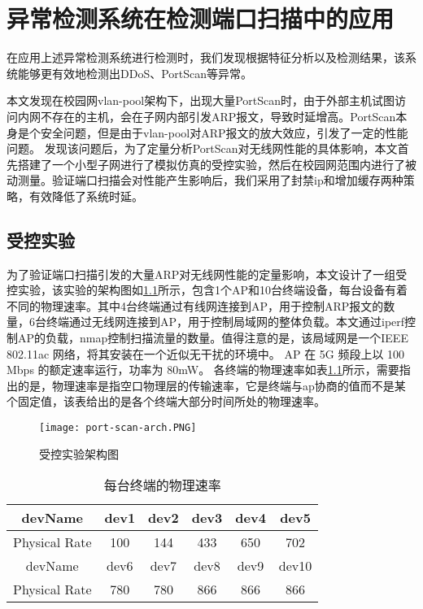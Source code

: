 \chapter{异常检测系统在检测端口扫描中的应用}
在应用上述异常检测系统进行检测时，我们发现根据特征分析以及检测结果，该系统能够更有效地检测出DDoS、PortScan等异常。

本文发现在校园网vlan-pool架构下，出现大量PortScan时，由于外部主机试图访问内网不存在的主机，会在子网内部引发ARP报文，导致时延增高。PortScan本身是个安全问题，但是由于vlan-pool对ARP报文的放大效应，引发了一定的性能问题。
发现该问题后，为了定量分析PortScan对无线网性能的具体影响，本文首先搭建了一个小型子网进行了模拟仿真的受控实验，然后在校园网范围内进行了被动测量。验证端口扫描会对性能产生影响后，我们采用了封禁ip和增加缓存两种策略，有效降低了系统时延。

\section{受控实验}
为了验证端口扫描引发的大量ARP对无线网性能的定量影响，本文设计了一组受控实验，该实验的架构图如\ref{fig:受控实验架构图}所示，包含1个AP和10台终端设备，每台设备有着不同的物理速率。其中4台终端通过有线网连接到AP，用于控制ARP报文的数量，6台终端通过无线网连接到AP，用于控制局域网的整体负载。本文通过iperf控制AP的负载，nmap控制扫描流量的数量。值得注意的是，该局域网是一个IEEE 802.11ac 网络，将其安装在一个近似无干扰的环境中。 AP 在 5G 频段上以 100 Mbps 的额定速率运行，功率为 80mW。 各终端的物理速率如表\ref{每台终端的物理速率}所示，需要指出的是，物理速率是指空口物理层的传输速率，它是终端与ap协商的值而不是某个固定值，该表给出的是各个终端大部分时间所处的物理速率。

\begin{figure}
  \centering
  \texttt{[image: port-scan-arch.PNG]}
  \caption{受控实验架构图}
  \label{fig:受控实验架构图}
\end{figure}

\begin{table}[h] 
  \centering  %
  \caption{每台终端的物理速率}  %
  \label{每台终端的物理速率}
  \begin{tabular}{c|ccccc}
  \toprule  %
  devName&dev1&dev2&dev3&dev4&dev5\\
  \hline  %
  Physical Rate&100&144&433&650&702\\
  \bottomrule
  \toprule %
  devName&dev6&dev7&dev8&dev9&dev10\\
  \hline  %
  Physical Rate&780&780&866&866&866\\
  \bottomrule %
  \end{tabular}
  
  \end{table}

